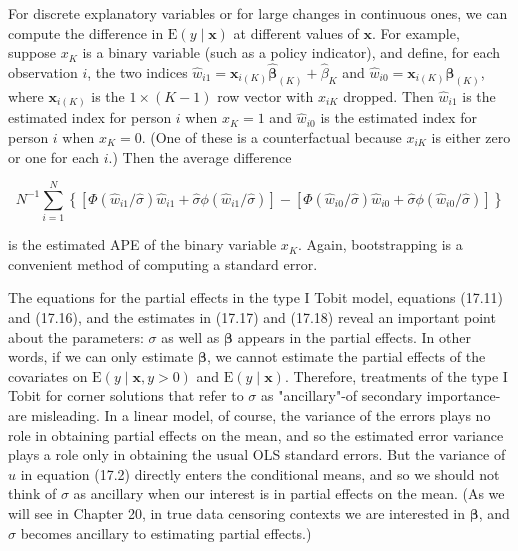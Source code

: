 \documentclass[10pt]{article}
\begin{document}
For discrete explanatory variables or for large changes in continuous ones, we can compute the difference in $\mathrm{E}(y \mid \mathbf{x})$ at different values of $\mathbf{x}$. For example, suppose $x_{K}$ is a binary variable (such as a policy indicator), and define, for each observation $i$, the two indices $\hat{w}_{i 1}=\mathbf{x}_{i(K)} \hat{\boldsymbol{\beta}}_{(K)}+\hat{\beta}_{K}$ and $\hat{w}_{i 0}=\mathbf{x}_{i(K)} \hat{\boldsymbol{\beta}}_{(K)}$, where $\mathbf{x}_{i(K)}$ is the $1 \times(K-1)$ row vector with $x_{i K}$ dropped. Then $\hat{w}_{i 1}$ is the estimated index for person $i$ when $x_{K}=1$ and $\hat{w}_{i 0}$ is the estimated index for person $i$ when $x_{K}=0$. (One of these is a counterfactual because $x_{i K}$ is either zero or one for each $i$.) Then the average difference


\begin{equation*}
N^{-1} \sum_{i=1}^{N}\left\{\left[\Phi\left(\hat{w}_{i 1} / \hat{\sigma}\right) \hat{w}_{i 1}+\hat{\sigma} \phi\left(\hat{w}_{i 1} / \hat{\sigma}\right)\right]-\left[\Phi\left(\hat{w}_{i 0} / \hat{\sigma}\right) \hat{w}_{i 0}+\hat{\sigma} \phi\left(\hat{w}_{i 0} / \hat{\sigma}\right)\right]\right\} \tag{17.18}
\end{equation*}


is the estimated APE of the binary variable $x_{K}$. Again, bootstrapping is a convenient method of computing a standard error.

The equations for the partial effects in the type I Tobit model, equations (17.11) and (17.16), and the estimates in (17.17) and (17.18) reveal an important point about the parameters: $\sigma$ as well as $\boldsymbol{\beta}$ appears in the partial effects. In other words, if we can only estimate $\boldsymbol{\beta}$, we cannot estimate the partial effects of the covariates on $\mathrm{E}(y \mid \mathbf{x}, y>0)$ and $\mathrm{E}(y \mid \mathbf{x})$. Therefore, treatments of the type I Tobit for corner solutions that refer to $\sigma$ as "ancillary"-of secondary importance-are misleading. In a linear model, of course, the variance of the errors plays no role in obtaining partial effects on the mean, and so the estimated error variance plays a role only in obtaining the usual OLS standard errors. But the variance of $u$ in equation (17.2) directly enters the conditional means, and so we should not think of $\sigma$ as ancillary when our interest is in partial effects on the mean. (As we will see in Chapter 20, in true data censoring contexts we are interested in $\boldsymbol{\beta}$, and $\sigma$ becomes ancillary to estimating partial effects.)
\end{document}
